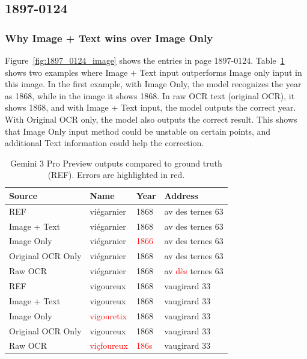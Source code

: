 \subsection{1897-0124}

\subsubsection{Why Image + Text wins over Image Only}
Figure~\ref{fig:1897_0124_image} shows the entries in page 1897-0124. Table~\ref{tab:model_comparison_errors} shows two examples where Image + Text input outperforms Image only input in this image. In the first example, with Image Only, the model recognizes the year as 1868, while in the image it shows 1868. In raw OCR text (original OCR), it shows 1868, and with Image + Text input, the model outputs the correct year. With Original OCR only, the model also outputs the correct result. This shows that Image Only input method could be unstable on certain points, and additional Text information could help the correction.

\begin{table}[htbp]
\centering
\small
\begin{tabular}{llll}
\hline
\textbf{Source} & \textbf{Name} & \textbf{Year} & \textbf{Address} \\
\hline
REF & viégarnier & 1868 & av des ternes 63 \\
Image + Text & viégarnier & 1868 & av des ternes 63 \\
Image Only & viégarnier & \textcolor{red}{1866} & av des ternes 63 \\
Original OCR Only & viégarnier & 1868 & av des ternes 63 \\
Raw OCR & viégarnier & 1868 & av \textcolor{red}{dès} ternes 63 \\
\hline
REF & vigoureux & 1868 & vaugirard 33 \\
Image + Text & vigoureux & 1868 & vaugirard 33 \\
Image Only & \textcolor{red}{vigouretix} & 1868 & vaugirard 33 \\
Original OCR Only & vigoureux & 1868 & vaugirard 33 \\
Raw OCR & \textcolor{red}{viçfoureux} & \textcolor{red}{186s} & vaugirard 33 \\
\hline
\end{tabular}
\caption{Gemini 3 Pro Preview outputs compared to ground truth (REF). Errors are highlighted in red.}
\label{tab:model_comparison_errors}
\end{table}

